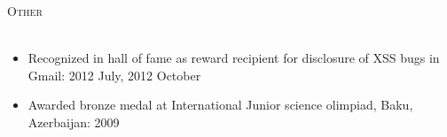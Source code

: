 \documentclass[a4paper]{article}
\newcommand{\header} [1] {
    {\hspace*{-18pt}\vspace*{6pt} \textsc{#1}
    \vspace*{-14pt} \\ \hspace*{-18pt} \hrulefill{} \\
    \vspace{1mm}}
}
\begin{document}
\header{Other}
\begin{itemize}[label=$\square$]
	\item Recognized in hall of fame as reward recipient for disclosure of XSS bugs in Gmail: 2012 July, 2012 October
	\item Awarded bronze medal at International Junior science olimpiad, Baku, Azerbaijan: 2009
\end{itemize}
\end{document}
